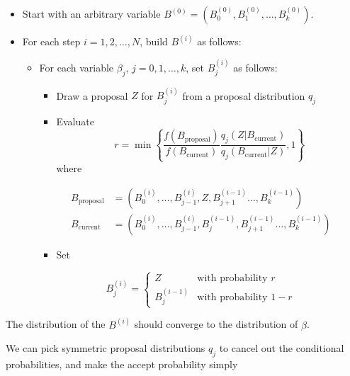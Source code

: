\begin{itemize}[tightlist]
\item
  Start with an arbitrary variable
  \(B^{(0)} = (B^{(0)}_{0}, B^{(0)}_{1}, \dots, B^{(0)}_{k})\).
\item
  For each step \(i = 1, 2, \dots, N\), build \(B^{(i)}\) as follows:

  \begin{itemize}
  \item
    For each variable \(\beta_{j}\), \(j = 0, 1, \dots, k\), set
\(B_{j}^{(i)}\) as follows:

    \begin{itemize}[tightlist]
    \item
      Draw a proposal \(Z\) for \(B_{j}^{(i)}\) from a proposal
      distribution \(q_{j}\)
    \item
      Evaluate
      \[ r = \min \left\{ \frac{f\left(B_\text{proposal}\right)}{f\left(B_\text{current}\right)} \frac{q_{j}(Z | B_\text{current})}{q_{j}(B_\text{current} | Z)}, 1\right\} \]
      where
    \end{itemize}

    \[
     \begin{align*}
     B_\text{proposal} &= \left(B_{0}^{(i)}, \dots, B_{j-1}^{(i)}, Z, B_{j + 1}^{(i - 1)} \dots, B_{k}^{(i - 1)}\right) \\
     B_\text{current} &= \left(B_{0}^{(i)}, \dots, B_{j-1}^{(i)}, B_{j}^{(i - 1)}, B_{j + 1}^{(i - 1)} \dots, B_{k}^{(i - 1)}\right)
     \end{align*}
     \]

    \begin{itemize}[tightlist]
    \item
      Set
    \end{itemize}

    \[ 
     B_{j}^{(i)} = \begin{cases}
     Z &\text{with probability } r \\
     B_{j}^{(i - 1)} &\text{with probability } 1 - r
     \end{cases}
     \]
  \end{itemize}
\end{itemize}

The distribution of the \(B^{(i)}\) should converge to the distribution
of \(\beta\).

We can pick symmetric proposal distributions \(q_{j}\) to cancel out the
conditional probabilities, and make the accept probability simply

